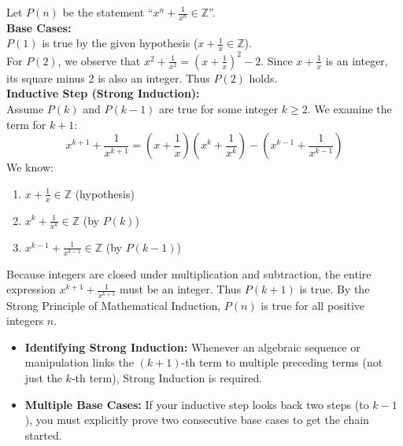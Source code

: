 \begin{solution}[Brief]
Let $P(n)$ be the statement ``$x^n + \frac{1}{x^n} \in \mathbb{Z}$''.\\
\textbf{Base Cases:}\\
$P(1)$ is true by the given hypothesis ($x + \frac{1}{x} \in \mathbb{Z}$).\\
For $P(2)$, we observe that $x^2 + \frac{1}{x^2} = \left(x + \frac{1}{x}\right)^2 - 2$. Since $x + \frac{1}{x}$ is an integer, its square minus 2 is also an integer. Thus $P(2)$ holds.\\
\textbf{Inductive Step (Strong Induction):} \\
Assume $P(k)$ and $P(k-1)$ are true for some integer $k \ge 2$. We examine the term for $k+1$:
$$ x^{k+1} + \frac{1}{x^{k+1}} = \left(x + \frac{1}{x}\right)\left(x^k + \frac{1}{x^k}\right) - \left(x^{k-1} + \frac{1}{x^{k-1}}\right) $$
We know:
\begin{enumerate}
    \item $x + \frac{1}{x} \in \mathbb{Z}$ (hypothesis)
    \item $x^k + \frac{1}{x^k} \in \mathbb{Z}$ (by $P(k)$)
    \item $x^{k-1} + \frac{1}{x^{k-1}} \in \mathbb{Z}$ (by $P(k-1)$)
\end{enumerate}
Because integers are closed under multiplication and subtraction, the entire expression $x^{k+1} + \frac{1}{x^{k+1}}$ must be an integer. Thus $P(k+1)$ is true. By the Strong Principle of Mathematical Induction, $P(n)$ is true for all positive integers $n$.
\end{solution}

\begin{takeaways}
\begin{itemize}
    \item \textbf{Identifying Strong Induction:} Whenever an algebraic sequence or manipulation links the $(k+1)$-th term to multiple preceding terms (not just the $k$-th term), Strong Induction is required.
    \item \textbf{Multiple Base Cases:} If your inductive step looks back two steps (to $k-1$), you must explicitly prove two consecutive base cases to get the chain started.
\end{itemize}
\end{takeaways}

